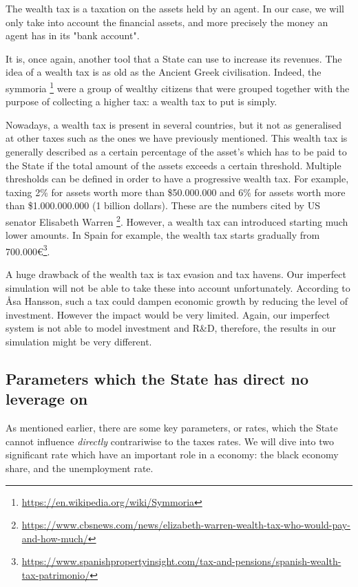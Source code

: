     The wealth tax is a taxation on the assets held by an agent. In our case, we will only take into account the financial assets, and more precisely the money an agent has in its "bank account".
    
    It is, once again, another tool that a State can use to increase its revenues. The idea of a wealth tax is as old as the Ancient Greek civilisation. Indeed, the symmoria \footnote{\url{https://en.wikipedia.org/wiki/Symmoria}} were a group of wealthy citizens that were grouped together with the purpose of collecting a higher tax: a wealth tax to put is simply.
    
    Nowadays, a wealth tax is present in several countries, but it not as generalised at other taxes such as the ones we have previously mentioned. This wealth tax is generally described as a certain percentage of the asset's which has to be paid to the State if the total amount of the assets exceeds a certain threshold. Multiple thresholds can be defined in order to have a progressive wealth tax. For example, taxing 2\% for assets worth more than \$50.000.000 and 6\% for assets worth more than \$1.000.000.000 (1 billion dollars). These are the numbers cited by US senator Elisabeth Warren \footnote{\url{https://www.cbsnews.com/news/elizabeth-warren-wealth-tax-who-would-pay-and-how-much/}}. However, a wealth tax can introduced starting much lower amounts. In Spain for example, the wealth tax starts gradually from 700.000\euro \footnote{\url{https://www.spanishpropertyinsight.com/tax-and-pensions/spanish-wealth-tax-patrimonio/}}.
    
    A huge drawback of the wealth tax is tax evasion and tax havens. Our imperfect simulation will not be able to take these into account unfortunately. According to Åsa Hansson, such a tax could dampen economic growth by reducing the level of investment. However the impact would be very limited.\cite{hansson2010wealth} Again, our imperfect system is not able to model investment and R\&D, therefore, the results in our simulation might be very different.


\subsection{Parameters which the State has direct no leverage on}
    
    As mentioned earlier, there are some key parameters, or rates, which the State cannot influence \emph{directly} contrariwise to the taxes rates. We will dive into two significant rate which have an important role in a economy: the black economy share, and the unemployment rate.

